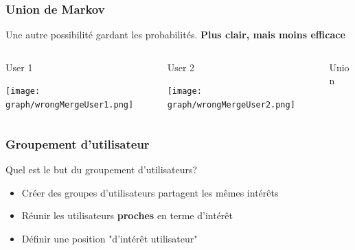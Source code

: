 \documentclass{beamer}
\begin{document}
            \begin{frame}
                \frametitle{Union de Markov}
                Une autre possibilité gardant les probabilités. \pause[5] \textbf{Plus clair, mais moins efficace}
                \pause[2]
                \begin{columns}[t]
                    \begin{column}{3cm}
                        \begin{exampleblock}{User 1}
                            \begin{center}
                                \texttt{[image: graph/wrongMergeUser1.png]}
                            \end{center}
                        \end{exampleblock}
                    \end{column}
                    \begin{column}{3cm}
                        \begin{exampleblock}{User 2}
                            \begin{center}
                                \texttt{[image: graph/wrongMergeUser2.png]}
                            \end{center}
                        \end{exampleblock}
                    \end{column}
                    \pause[3]
                    \begin{column}{3cm}
                        \begin{exampleblock}{Union}
                            \begin{center}
                                \pause[4]
                            \end{center}
                        \end{exampleblock}
                    \end{column}
                \end{columns}
            \end{frame}
            \begin{frame}
                \frametitle{Groupement d'utilisateur}
                Quel est le but du groupement d'utilisateurs?
                \pause
                \begin{itemize}
                    \item Créer des groupes d'utilisateurs partagent les mêmes intérêts
                    \pause
                    \item Réunir les utilisateurs \textbf{proches} en terme d'intérêt
                    \pause
                    \item Définir une position "d'intérêt utilisateur"
                \end{itemize}
            \end{frame}
\end{document}
